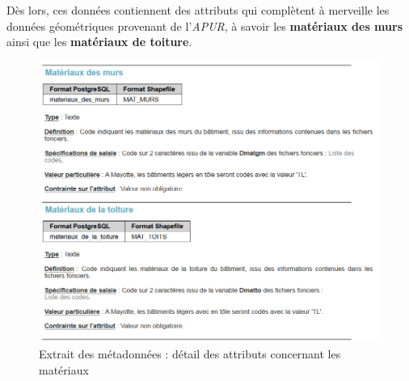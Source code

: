 \documentclass[
  11pt,
  french,
]{article}
\begin{document}
Dès lors, ces données contiennent des attributs qui complètent à
merveille les données géométriques provenant de l'\emph{APUR}, à savoir
les \textbf{matériaux des murs} ainsi que les \textbf{matériaux de
toiture}.

\begin{tcolorbox}
\begin{figure}

{\centering \includegraphics[width=0.9\linewidth]{__imgs/meta_ign_2} 

}

\caption[Extrait des métadonnées : détail des attributs concernant les matériaux  -  \url{https://qlf-geoservices.ign.fr/ressources_documentaires/Espace_documentaire/BASES_VECTORIELLES/BDTOPO/DC_BDTOPO_3-0.pdf}]{Extrait des métadonnées : détail des attributs concernant les matériaux}\label{fig:meta_ign_2}
\end{figure}
\end{tcolorbox}
\end{document}
